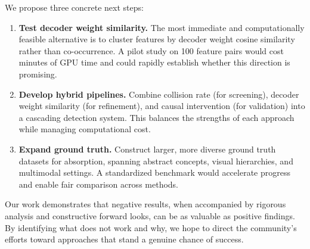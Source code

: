 \documentclass{article}
\begin{document}
We propose three concrete next steps:
\begin{enumerate}
\item \textbf{Test decoder weight similarity.} The most immediate and computationally feasible alternative is to cluster features by decoder weight cosine similarity rather than co-occurrence. A pilot study on 100 feature pairs would cost minutes of GPU time and could rapidly establish whether this direction is promising.
\item \textbf{Develop hybrid pipelines.} Combine collision rate (for screening), decoder weight similarity (for refinement), and causal intervention (for validation) into a cascading detection system. This balances the strengths of each approach while managing computational cost.
\item \textbf{Expand ground truth.} Construct larger, more diverse ground truth datasets for absorption, spanning abstract concepts, visual hierarchies, and multimodal settings. A standardized benchmark would accelerate progress and enable fair comparison across methods.
\end{enumerate}

Our work demonstrates that negative results, when accompanied by rigorous analysis and constructive forward looks, can be as valuable as positive findings. By identifying what does not work and why, we hope to direct the community's efforts toward approaches that stand a genuine chance of success.



\end{document}
